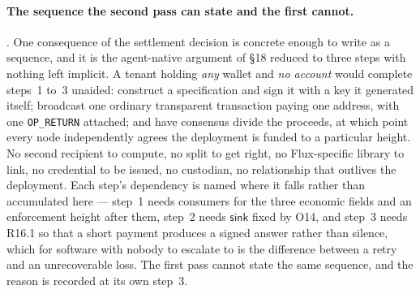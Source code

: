 \paragraph{The sequence the second pass can state and the first cannot.}
\planned. One consequence of the settlement decision is concrete enough to write as a sequence, and
it is the agent-native argument of \S18 reduced to three steps with nothing left implicit. A tenant
holding \emph{any} wallet and \emph{no account} would complete steps~1 to~3 unaided: construct a
 specification and sign it with a key it generated itself; broadcast one ordinary
transparent transaction paying one address, with one \texttt{OP\_RETURN} attached; and have consensus
divide the proceeds, at which point every node independently agrees the deployment is funded to a
particular height. No second recipient to compute, no split to get right, no Flux-specific library to
link, no credential to be issued, no custodian, no relationship that outlives the deployment. Each
step's dependency is named where it falls rather than accumulated here --- step~1 needs consumers for
the three economic fields and an enforcement height after them, step~2 needs $\mathsf{sink}$ fixed by
O14, and step~3 needs R16.1 so that a short payment produces a signed answer rather than silence,
which for software with nobody to escalate to is the difference between a retry and an unrecoverable
loss. The first pass cannot state the same sequence, and the reason is recorded at its own step~3.

